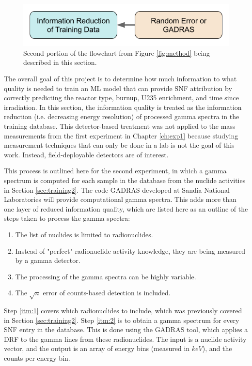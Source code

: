 \begin{figure}[H]
  \centering
  \includegraphics[width=0.7\linewidth]{./chapters/exp1/methodology2.png}
  \caption{Second portion of the flowchart from Figure \ref{fig:method} being 
           described in this section.}
\end{figure}

The overall goal of this project is to determine how much information to what
quality is needed to train an \gls{ML} model that can provide \gls{SNF}
attribution by correctly predicting the reactor type, burnup, \gls{U235}
enrichment, and time since irradiation.  In this section, the information
quality is treated as the information reduction (i.e. decreasing energy
resolution) of processed gamma spectra in the training database.  This
detector-based treatment was not applied to the mass measurements from the
first experiment in Chapter \ref{ch:exp1} because studying measurement
techniques that can only be done in a lab is not the goal of this work.
Instead, field-deployable detectors are of interest.

This process is outlined here for the second experiment, in which a gamma
spectrum is computed for each sample in the database from the nuclide
activities in Section \ref{sec:training2}.  
The code \gls{GADRAS} \cite{gadras} developed at Sandia National Laboratories will provide
computational gamma spectra.  
This adds more than one layer of reduced information quality, which are listed here as an outline of the steps taken to
process the gamma spectra:

\begin{enumerate}
  \item \label{itm:1} The list of nuclides is limited to radionuclides.
  \item \label{itm:2} Instead of "perfect" radionuclide activity knowledge, 
        they are being measured by a gamma detector.
  \item \label{itm:3} The processing of the gamma spectra can be highly variable.
  \item \label{itm:4} The $\sqrt{n}$ error of counts-based detection is included. 
\end{enumerate}

Step \ref{itm:1} covers which radionuclides to include, which was previously
covered in Section \ref{sec:training2}. Step \ref{itm:2} is to obtain a gamma
spectrum for every \gls{SNF} entry in the database. This is done using the
\gls{GADRAS} tool, which applies a \gls{DRF} to the gamma lines from these
radionuclides. The input is a nuclide activity vector, and the output is an
array of energy bins (measured in $keV$), and the counts per energy bin.

